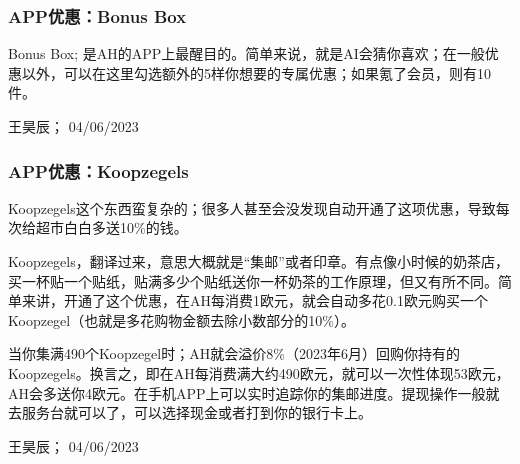 \subsubsection{APP优惠：Bonus Box}
Bonus Box; 是AH的APP上最醒目的。简单来说，就是AI会猜你喜欢；在一般优惠以外，可以在这里勾选额外的5样你想要的专属优惠；如果氪了会员，则有10件。
\begin{flushright}
王昊辰； 04/06/2023
\end{flushright}

\subsubsection{APP优惠：Koopzegels}
Koopzegels这个东西蛮复杂的；很多人甚至会没发现自动开通了这项优惠，导致每次给超市白白多送10\%的钱。

Koopzegels，翻译过来，意思大概就是“集邮”或者印章。有点像小时候的奶茶店，买一杯贴一个贴纸，贴满多少个贴纸送你一杯奶茶的工作原理，但又有所不同。简单来讲，开通了这个优惠，在AH每消费1欧元，就会自动多花0.1欧元购买一个Koopzegel（也就是多花购物金额去除小数部分的10\%）。

当你集满490个Koopzegel时；AH就会溢价8\%（2023年6月）回购你持有的Koopzegels。换言之，即在AH每消费满大约490欧元，就可以一次性体现53欧元，AH会多送你4欧元。在手机APP上可以实时追踪你的集邮进度。提现操作一般就去服务台就可以了，可以选择现金或者打到你的银行卡上。
\begin{flushright}
王昊辰； 04/06/2023
\end{flushright}
